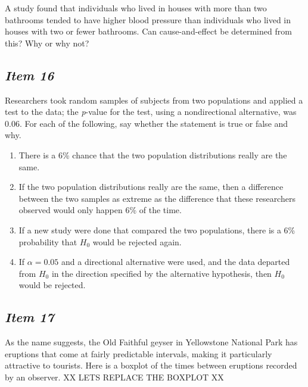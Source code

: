 A study found that individuals who lived in houses with more than two bathrooms tended to have higher blood pressure than individuals who lived in houses with two or fewer bathrooms. Can cause-and-effect be determined from this? Why or why not?





\subsection{\textbf{\textit{Item 16}}}


Researchers took random samples of subjects from two populations and applied a test to the data; the \textit{p}-value for the test, using a nondirectional alternative, was 0.06. For each of the following, say whether the statement is true or false and why.


\begin{enumerate}[leftmargin=1cm, itemsep=.2em]


\item There is a 6\% chance that the two population distributions really are the same.


\item If the two population distributions really are the same, then a difference between the two samples as extreme as the difference that these researchers observed would only happen 6\% of the time.


\item If a new study were done that compared the two populations, there is a 6\% probability that $H_0$ would be rejected again.


\item If $\alpha = 0.05$ and a directional alternative were used, and the data departed from $H_0$ in the direction specified by the alternative hypothesis, then $H_0$ would be rejected.


\end{enumerate}





\subsection{\textbf{\textit{Item 17}}}





As the name suggests, the Old Faithful geyser in Yellowstone National
Park has eruptions that come at fairly predictable intervals, making
it particularly attractive to tourists. Here is a boxplot of the times
between eruptions recorded by an observer.
XX LETS REPLACE THE BOXPLOT XX





